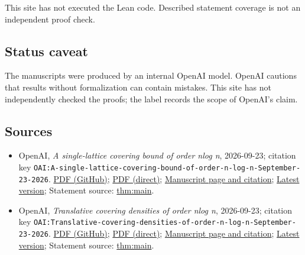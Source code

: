 \documentclass[11pt]{article}
\begin{document}
This site has not executed the Lean code. Described statement coverage is not an independent proof check.

\subsection{Status caveat}
The manuscripts were produced by an internal OpenAI model. OpenAI cautions that results without formalization can contain mistakes. This site has not independently checked the proofs; the label records the scope of OpenAI's claim.

\subsection{Sources}
\begin{itemize}
\item OpenAI, \emph{A single-lattice covering bound of order nlog n}, 2026-09-23; citation key \texttt{OAI:A-single-lattice-covering-bound-of-order-n-log-n-September-23-2026}. \href{https://github.com/openai/math/blob/adc7f1241b42e322a6451854ab7e4b4c146bf78a/preprints/A-single-lattice-covering-bound-of-order-n-log-n-September-23-2026/paper.pdf}{PDF (GitHub)}; \href{https://github.com/openai/math/raw/adc7f1241b42e322a6451854ab7e4b4c146bf78a/preprints/A-single-lattice-covering-bound-of-order-n-log-n-September-23-2026/paper.pdf}{PDF (direct)}; \href{https://github.com/openai/math/blob/adc7f1241b42e322a6451854ab7e4b4c146bf78a/preprints/A-single-lattice-covering-bound-of-order-n-log-n-September-23-2026/README.md}{Manuscript page and citation}; \href{https://github.com/openai/math/blob/main/preprints/A-single-lattice-covering-bound-of-order-n-log-n-September-23-2026/paper.pdf}{Latest version}; Statement source: \href{https://github.com/openai/math/blob/adc7f1241b42e322a6451854ab7e4b4c146bf78a/preprints/A-single-lattice-covering-bound-of-order-n-log-n-September-23-2026/build/overview.tex\#L16}{thm:main}.
\item OpenAI, \emph{Translative covering densities of order nlog n}, 2026-09-23; citation key \texttt{OAI:Translative-covering-densities-of-order-n-log-n-September-23-2026}. \href{https://github.com/openai/math/blob/adc7f1241b42e322a6451854ab7e4b4c146bf78a/preprints/Translative-covering-densities-of-order-n-log-n-September-23-2026/paper.pdf}{PDF (GitHub)}; \href{https://github.com/openai/math/raw/adc7f1241b42e322a6451854ab7e4b4c146bf78a/preprints/Translative-covering-densities-of-order-n-log-n-September-23-2026/paper.pdf}{PDF (direct)}; \href{https://github.com/openai/math/blob/adc7f1241b42e322a6451854ab7e4b4c146bf78a/preprints/Translative-covering-densities-of-order-n-log-n-September-23-2026/README.md}{Manuscript page and citation}; \href{https://github.com/openai/math/blob/main/preprints/Translative-covering-densities-of-order-n-log-n-September-23-2026/paper.pdf}{Latest version}; Statement source: \href{https://github.com/openai/math/blob/adc7f1241b42e322a6451854ab7e4b4c146bf78a/preprints/Translative-covering-densities-of-order-n-log-n-September-23-2026/build/sections/01-introduction.tex\#L49}{thm:main}.

\end{itemize}
\end{document}

